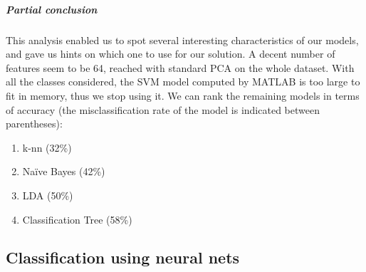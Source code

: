 \documentclass[twocolumn]{article}%
\begin{document}
	\subparagraph{Partial conclusion}
	This analysis enabled us to spot several interesting characteristics of our models, and gave us hints on which one to use for our solution. A decent number of features seem to be 64, reached with standard PCA on the whole dataset. With all the classes considered, the SVM model computed by MATLAB is too large to fit in memory, thus we stop using it. We can rank the remaining models in terms of accuracy (the misclassification rate of the model is indicated between parentheses):
	\begin{enumerate}
	\item k-nn (32\%)
	\item Naïve Bayes (42\%)
	\item LDA (50\%)
	\item Classification Tree (58\%)
	\end{enumerate}
	
	
	\subsection{Classification using neural nets}	
	
\end{document}
